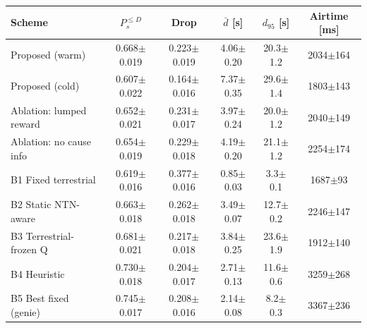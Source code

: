 \begin{tabular}{lccccc}
\toprule
Scheme & $P_s^{\le D}$ & Drop & $\bar d$ [s] & $d_{95}$ [s] & Airtime [ms] \\
\midrule
Proposed (warm) & 0.668$\pm$0.019 & 0.223$\pm$0.019 & 4.06$\pm$0.20 & 20.3$\pm$1.2 & 2034$\pm$164 \\
Proposed (cold) & 0.607$\pm$0.022 & 0.164$\pm$0.016 & 7.37$\pm$0.35 & 29.6$\pm$1.4 & 1803$\pm$143 \\
Ablation: lumped reward & 0.652$\pm$0.021 & 0.231$\pm$0.017 & 3.97$\pm$0.24 & 20.0$\pm$1.2 & 2040$\pm$149 \\
Ablation: no cause info & 0.654$\pm$0.019 & 0.229$\pm$0.018 & 4.19$\pm$0.20 & 21.1$\pm$1.2 & 2254$\pm$174 \\
B1 Fixed terrestrial & 0.619$\pm$0.016 & 0.377$\pm$0.016 & 0.85$\pm$0.03 & 3.3$\pm$0.1 & 1687$\pm$93 \\
B2 Static NTN-aware & 0.663$\pm$0.018 & 0.262$\pm$0.018 & 3.49$\pm$0.07 & 12.7$\pm$0.2 & 2246$\pm$147 \\
B3 Terrestrial-frozen Q & 0.681$\pm$0.021 & 0.217$\pm$0.018 & 3.84$\pm$0.25 & 23.6$\pm$1.9 & 1912$\pm$140 \\
B4 Heuristic & 0.730$\pm$0.018 & 0.204$\pm$0.017 & 2.71$\pm$0.13 & 11.6$\pm$0.6 & 3259$\pm$268 \\
B5 Best fixed (genie) & 0.745$\pm$0.017 & 0.208$\pm$0.016 & 2.14$\pm$0.08 & 8.2$\pm$0.3 & 3367$\pm$236 \\
\bottomrule
\end{tabular}